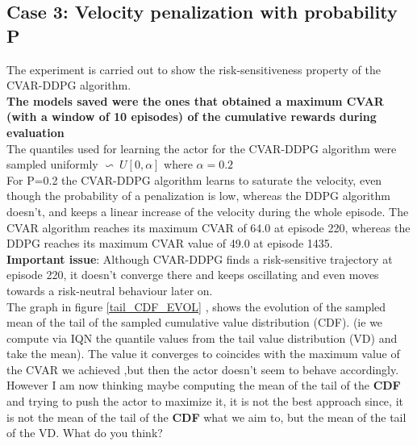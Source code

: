 \newpage
\subsection{Case 3: Velocity penalization with probability P }
The experiment is carried out to show the risk-sensitiveness property of the CVAR-DDPG algorithm.\\

\textbf{The models saved were the ones that obtained a maximum CVAR (with a window of 10 episodes) of the cumulative rewards during evaluation}\\
The quantiles used for learning the actor for the CVAR-DDPG algorithm were sampled uniformly $\backsim\ U[0,\alpha] $ where $\alpha=0.2$\\

For P=0.2 the CVAR-DDPG algorithm learns to saturate the velocity, even though the probability of a penalization is low, whereas the DDPG algorithm doesn't, and keeps a linear increase of the velocity during the whole episode.
The CVAR algorithm reaches its maximum CVAR of 64.0 at episode 220, whereas the DDPG reaches its maximum CVAR value of 49.0 at episode 1435.\\

\textbf{Important issue}: Although CVAR-DDPG finds a risk-sensitive trajectory at episode 220, it doesn't converge there and keeps oscillating and even moves towards a risk-neutral behaviour later on.\\
The graph in figure \ref{tail_CDF_EVOL} , shows the evolution of the sampled mean of the tail of the sampled cumulative value distribution (CDF). (ie we compute via IQN the quantile values from the tail value distribution (VD) and take the mean).
The value it converges to coincides with the maximum value of the CVAR we achieved ,but then the actor doesn't seem to behave accordingly.\\
However I am now thinking maybe computing the mean of the tail of the \textbf{CDF} and trying to push the actor to maximize it, it is not the best approach since, it is not the mean of the tail of the \textbf{CDF} what we aim to, but the mean of the tail of the VD. What do you think?


